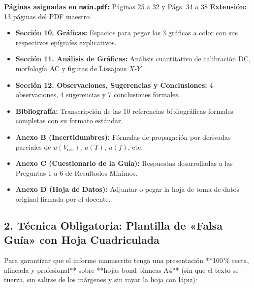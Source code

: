\documentclass[a4paper, 10pt]{article}
\begin{document}
\vspace{0.05cm}

\begin{tcolorbox}[title=BLOQUE 3 — Asignado a: Piero Alejandro Sánchez Feril, colframe=box-purple]
    \footnotesize
    \textbf{Páginas asignadas en \texttt{main.pdf}:} Páginas 25 a 32 y Págs. 34 a 38 \hfill \textbf{Extensión:} 13 páginas del PDF maestro
    \begin{itemize}[leftmargin=1.5em, itemsep=1.2pt, topsep=1pt]
        \item \textbf{Sección 10. Gráficas:} Espacios para pegar las 3 gráficas a color con sus respectivos epígrafes explicativos.
        \item \textbf{Sección 11. Análisis de Gráficas:} Análisis cuantitativo de calibración DC, morfología AC y figuras de Lissajous $X$-$Y$.
        \item \textbf{Sección 12. Observaciones, Sugerencias y Conclusiones:} 4 observaciones, 4 sugerencias y 7 conclusiones formales.
        \item \textbf{Bibliografía:} Transcripción de las 10 referencias bibliográficas formales completas con su formato estándar.
        \item \textbf{Anexo B (Incertidumbres):} Fórmulas de propagación por derivadas parciales de $u(V_{\text{osc}})$, $u(T)$, $u(f)$, etc.
        \item \textbf{Anexo C (Cuestionario de la Guía):} Respuestas desarrolladas a las Preguntas 1 a 6 de Resultados Mínimos.
        \item \textbf{Anexo D (Hoja de Datos):} Adjuntar o pegar la hoja de toma de datos original firmada por el docente.
    \end{itemize}
\end{tcolorbox}

\newpage

\subsection*{\color{uni-blue}2. Técnica Obligatoria: Plantilla de «Falsa Guía» con Hoja Cuadriculada}

Para garantizar que el informe manuscrito tenga una presentación **100\,\% recta, alineada y profesional** sobre **hojas bond blancas A4** (sin que el texto se tuerza, sin salirse de los márgenes y sin rayar la hoja con lápiz):
\end{document}
